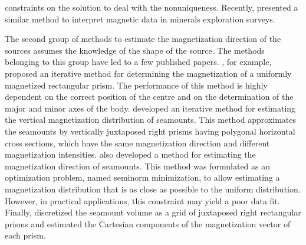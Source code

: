 \documentclass[journal abbreviation, npg]{copernicus}
\begin{document}
constraints on the solution to deal with the nonuniqueness. Recently, \citet{ellis-etal2012} presented a similar method to interpret magnetic data in minerals exploration surveys.

The second group of methods to estimate the magnetization direction of the sources assumes the knowledge of the shape of the source. The methods belonging to this group have led to a few published papers. \citet{bhattacharyya1966}, for example, proposed an iterative method for determining the magnetization of a uniformly magnetized rectangular prism. The performance of this method is highly dependent on the correct position of the centre and on the determination of the major and minor axes of the body. \citet{emilia-massey1974} developed an iterative method for estimating the vertical magnetization distribution of seamounts. This method approximates the seamounts by vertically juxtaposed right prisms having polygonal horizontal cross sections, which have the same magnetization direction and different magnetization intensities. \citet{parker-etal1987} also developed a method for estimating the magnetization direction of seamounts. This method was formulated as an optimization problem, named seminorm minimization, to allow estimating a magnetization distribution that is as close as possible to the uniform distribution. However, in practical applications, this constraint may yield a poor data fit. Finally, \citet{kubota-uchiyama2005} discretized the seamount volume as a grid of juxtaposed right rectangular prisms and estimated the Cartesian components of the magnetization vector of each prism.
\end{document}
